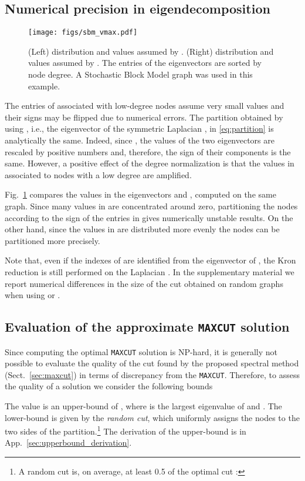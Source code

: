 \documentclass[journal]{IEEEtran}
\newcommand{\maxcut}{\texttt{\small{MAXCUT}}}
\begin{document}
\subsection{Numerical precision in eigendecomposition}
\begin{figure}[!ht]
    \centering
    \texttt{[image: figs/sbm\_vmax.pdf]}    
    \caption{(Left) distribution and values assumed by . (Right) distribution and values assumed by . The entries of the eigenvectors are sorted by node degree. A Stochastic Block Model graph was used in this example.}
    \label{fig:v_max}
\end{figure}
The entries of  associated with low-degree nodes assume very small values and their signs may be flipped due to numerical errors.
The partition obtained by using , i.e., the eigenvector of the symmetric Laplacian , in \eqref{eq:partition} is analytically the same.
Indeed, since , the values of the two eigenvectors are rescaled by positive numbers and, therefore, the sign of their components is the same.
However, a positive effect of the degree normalization is that the values in  associated to nodes with a low degree are amplified.

Fig.~\ref{fig:v_max} compares the values in the eigenvectors  and , computed on the same graph.
Since many values in  are concentrated around zero, partitioning the nodes according to the sign of the entries in  gives numerically unstable results.
On the other hand, since the values in  are distributed more evenly the nodes can be partitioned more precisely. 

Note that, even if the indexes of  are identified from the eigenvector of , the Kron reduction is still performed on the Laplacian .
In the supplementary material we report numerical differences in the size of the cut obtained on random graphs when using  or .

\subsection{Evaluation of the approximate \maxcut{} solution}
\label{sec:maxcut_eval}
Since computing the optimal \maxcut{} solution is NP-hard, it is generally not possible to evaluate the quality of the cut found by the proposed spectral method (Sect.~\ref{sec:maxcut}) in terms of discrepancy from the \maxcut{}.
Therefore, to assess the quality of a solution we consider the following bounds

The value  is an upper-bound of , where  is the largest eigenvalue of  and .
The lower-bound  is given by the \textit{random cut}, which uniformly assigns the nodes to the two sides of the partition.\footnote{\label{note_rc}A random cut  is, on average, at least 0.5 of the optimal cut : } 
The derivation of the upper-bound is in App.~\ref{sec:upperbound_derivation}.
\end{document}
